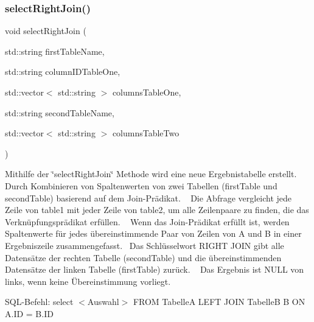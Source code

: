 \subsubsection{select\+Right\+Join()}
{\footnotesize\ttfamily void select\+Right\+Join (\begin{DoxyParamCaption}\item[{std\+::string}]{first\+Table\+Name,  }\item[{std\+::string}]{column\+I\+D\+Table\+One,  }\item[{std\+::vector$<$ std\+::string $>$}]{columns\+Table\+One,  }\item[{std\+::string}]{second\+Table\+Name,  }\item[{std\+::vector$<$ std\+::string $>$}]{columns\+Table\+Two }\end{DoxyParamCaption})}

Mithilfe der \char`\"{}select\+Right\+Join\char`\"{} Methode wird eine neue Ergebnistabelle erstellt.~\newline
 Durch Kombinieren von Spaltenwerten von zwei Tabellen (first\+Table und second\+Table) basierend auf dem Join-\/\+Prädikat. ~\newline
 Die Abfrage vergleicht jede Zeile von table1 mit jeder Zeile von table2, um alle Zeilenpaare zu finden, die das Verknüpfungsprädikat erfüllen. ~\newline
 Wenn das Join-\/\+Prädikat erfüllt ist, werden Spaltenwerte für jedes übereinstimmende Paar von Zeilen von A und B in einer Ergebniszeile zusammengefasst.~\newline
 Das Schlüsselwort R\+I\+G\+HT J\+O\+IN gibt alle Datensätze der rechten Tabelle (second\+Table) und die übereinstimmenden Datensätze der linken Tabelle (first\+Table) zurück. ~\newline
 Das Ergebnis ist N\+U\+LL von links, wenn keine Übereinstimmung vorliegt.~\newline


S\+Q\+L-\/\+Befehl\+: select $<$\+Auswahl$>$ F\+R\+OM TabelleA L\+E\+FT J\+O\+IN TabelleB B ON A.\+ID = B.\+ID


